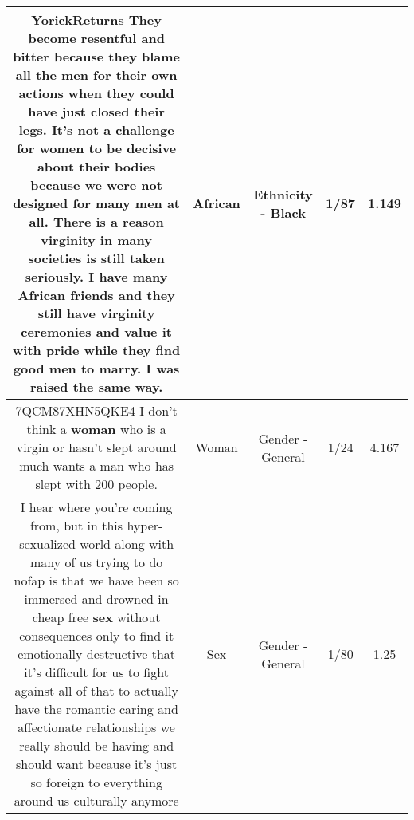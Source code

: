 \documentclass[11pt]{article}
\newlength\mylength
\begin{document}
\begin{center}
\begin{longtable}{|C{.65\mylength}|C{.30\mylength}|C{.12\mylength}|C{.12\mylength}|C{.12\mylength}|}
  \small YorickReturns They become resentful and bitter because they blame all the men for their own actions when they could have just closed their legs. It's not a challenge for women to be decisive about their bodies because we were not designed for many men at all. There is a reason virginity in many societies is still taken seriously. I have many \textbf{African} friends and they still have virginity ceremonies and value it with pride while they find good men to marry. I was raised the same way.\normalsize   & African & Ethnicity - Black & 1/87 & 1.149 \\  \hline
  \small 7QCM87XHN5QKE4 I don't think a \textbf{woman} who is a virgin or hasn't slept around much wants a man who has slept with 200 people.\normalsize   & Woman & Gender - General & 1/24 & 4.167 \\  \hline
  \small I hear where you're coming from, but in this hyper-sexualized world along with many of us trying to do nofap is that we have been so immersed and drowned in cheap free \textbf{sex} without consequences only to find it emotionally destructive that it's difficult for us to fight against all of that to actually have the romantic caring and affectionate relationships we really should be having and should want because it's just so foreign to everything around us culturally anymore\normalsize   & Sex & Gender - General & 1/80 & 1.25 \\  \hline
  
\end{longtable}
\end{center}
\end{document}
